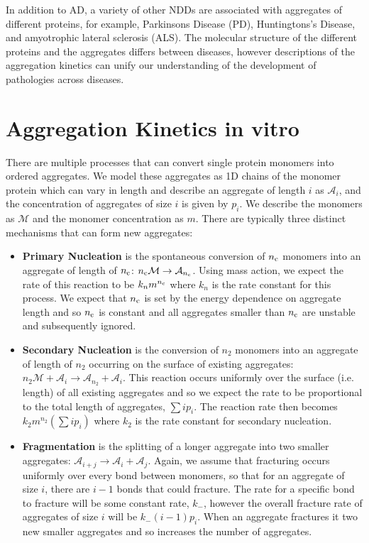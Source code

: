 In addition to AD, a variety of other NDDs are associated with aggregates of different proteins, for example, Parkinsons Disease (PD), Huntingtons's Disease, and amyotrophic lateral sclerosis (ALS). \cite{chiti_protein_2006, chiti_protein_2017} The molecular structure of the different proteins and the aggregates differs between diseases, however descriptions of the aggregation kinetics can unify our understanding of the development of pathologies across diseases. \cite{meisl_thermodynamics_2024}

\section{Aggregation Kinetics in vitro}

There are multiple processes that can convert single protein monomers into ordered aggregates. We model these aggregates as 1D chains of the monomer protein which can vary in length and describe an aggregate of length $i$ as $\mathcal{A}_i$, and the concentration of aggregates of size $i$ is given by $p_i$. We describe the monomers as $\mathcal{M}$ and the monomer concentration as $m$. There are typically three distinct mechanisms that can form new aggregates:
\begin{itemize}
    \item \textbf{Primary Nucleation} is the spontaneous conversion of $n_{\mathrm{c}}$ monomers into an aggregate of length of $n_{\mathrm{c}}$: $n_{\mathrm{c}}\mathcal{M} \rightarrow \mathcal{A}_{n_{\mathrm{c}}}$. Using mass action, we expect the rate of this reaction to be $k_n m^{n_{\mathrm{c}}}$ where $k_n$ is the rate constant for this process. We expect that $n_{\mathrm{c}}$ is set by the energy dependence on aggregate length and so $n_{\mathrm{c}}$ is constant and all aggregates smaller than $n_{\mathrm{c}}$ are unstable and subsequently ignored.
    \item \textbf{Secondary Nucleation} is the conversion of $n_2$ monomers into an aggregate of length of $n_2$ occurring on the surface of existing aggregates: $n_2 \mathcal{M} + \mathcal{A}_{i} \rightarrow \mathcal{A}_{n_2} + \mathcal{A}_{i}$. This reaction occurs uniformly over the surface (i.e. length) of all existing aggregates and so we expect the rate to be proportional to the total length of aggregates, $\sum i p_i$. The reaction rate then becomes $k_2 m^{n_2}(\sum i p_i)$ where $k_2$ is the rate constant for secondary nucleation.
    \item \textbf{Fragmentation} is the splitting of a longer aggregate into two smaller aggregates: $\mathcal{A}_{i+j} \rightarrow \mathcal{A}_{i} + \mathcal{A}_{j}$. Again, we assume that fracturing occurs uniformly over every bond between monomers, so that for an aggregate of size $i$, there are $i-1$ bonds that could fracture. The rate for a specific bond to fracture will be some constant rate, $k_{-}$, however the overall fracture rate of aggregates of size $i$ will be $k_{-}(i-1)p_i$. When an aggregate fractures it two new smaller aggregates and so increases the number of aggregates.
\end{itemize}

